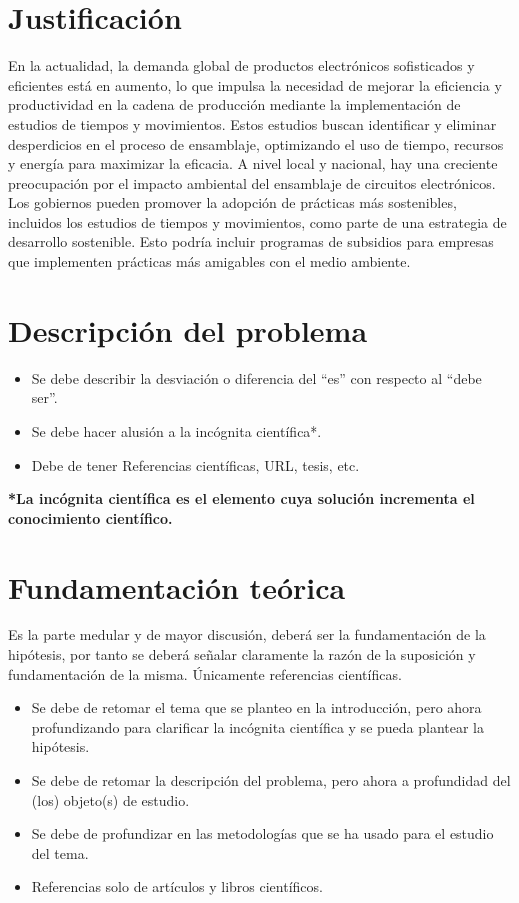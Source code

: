     \section{Justificación}
    
    
    En la actualidad, la demanda global de productos electrónicos sofisticados y eficientes está en aumento, lo que impulsa la necesidad de mejorar la eficiencia y productividad en la cadena de producción mediante la implementación de estudios de tiempos y movimientos. Estos estudios buscan identificar y eliminar desperdicios en el proceso de ensamblaje, optimizando el uso de tiempo, recursos y energía para maximizar la eficacia.
    A nivel local y nacional, hay una creciente preocupación por el impacto ambiental del ensamblaje de circuitos electrónicos. Los gobiernos pueden promover la adopción de prácticas más sostenibles, incluidos los estudios de tiempos y movimientos, como parte de una estrategia de desarrollo sostenible. Esto podría incluir programas de subsidios para empresas que implementen prácticas más amigables con el medio ambiente.
    
    \section{Descripción del problema}
    \begin{itemize}
        \item Se debe describir la desviación o diferencia del ``es'' con respecto al ``debe ser''.
        \item Se debe hacer alusión a la incógnita científica*.
        \item Debe de tener Referencias científicas, URL, tesis, etc.
    \end{itemize}
    
    \textbf{*La incógnita científica es el elemento cuya solución incrementa el conocimiento científico.}
    \section{Fundamentación teórica}
    
    Es la parte medular y de mayor discusión, deberá ser la fundamentación de la hipótesis, por tanto se deberá señalar claramente la razón de la suposición y fundamentación de la misma. Únicamente referencias científicas.
    \begin{itemize}
        \item Se debe de retomar el tema que se planteo en la introducción, pero ahora profundizando para clarificar la incógnita científica y se pueda plantear la hipótesis.
        \item Se debe de retomar la descripción del problema, pero ahora a profundidad del (los) objeto(s) de estudio. 
        \item Se debe de profundizar en las metodologías que se ha usado para el estudio del tema.
        \item Referencias solo de artículos y libros científicos.
    \end{itemize}
